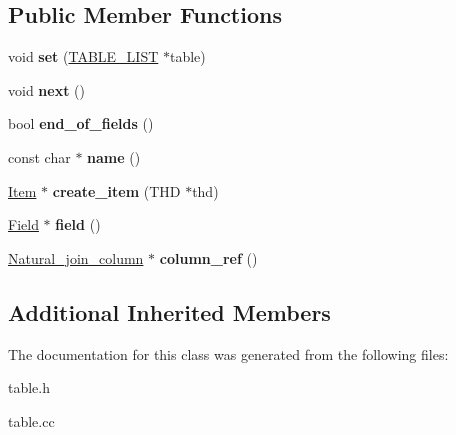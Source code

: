 \subsection*{Public Member Functions}
\begin{DoxyCompactItemize}
\item 
\mbox{\label{classField__iterator__natural__join_ac58afa94071c363d9a8ddd5793ae71e9}} 
void {\bfseries set} (\mbox{\hyperlink{structTABLE__LIST}{T\+A\+B\+L\+E\+\_\+\+L\+I\+ST}} $\ast$table)
\item 
\mbox{\label{classField__iterator__natural__join_a8ac22e365551a65bdc3f16ab4161b89d}} 
void {\bfseries next} ()
\item 
\mbox{\label{classField__iterator__natural__join_a86b73eb11d21009ee572082ca298c3b1}} 
bool {\bfseries end\+\_\+of\+\_\+fields} ()
\item 
\mbox{\label{classField__iterator__natural__join_acf5a0a692ba729d6aa5ecc72863a7a4b}} 
const char $\ast$ {\bfseries name} ()
\item 
\mbox{\label{classField__iterator__natural__join_a343f5ff97131a6be001f81918bfb8265}} 
\mbox{\hyperlink{classItem}{Item}} $\ast$ {\bfseries create\+\_\+item} (T\+HD $\ast$thd)
\item 
\mbox{\label{classField__iterator__natural__join_afa16e80da7aad0eda4e3cb351a3d3d51}} 
\mbox{\hyperlink{classField}{Field}} $\ast$ {\bfseries field} ()
\item 
\mbox{\label{classField__iterator__natural__join_acbf0ce72a239e7782947503ef041f91d}} 
\mbox{\hyperlink{classNatural__join__column}{Natural\+\_\+join\+\_\+column}} $\ast$ {\bfseries column\+\_\+ref} ()
\end{DoxyCompactItemize}
\subsection*{Additional Inherited Members}


The documentation for this class was generated from the following files\+:\begin{DoxyCompactItemize}
\item 
table.\+h\item 
table.\+cc\end{DoxyCompactItemize}
